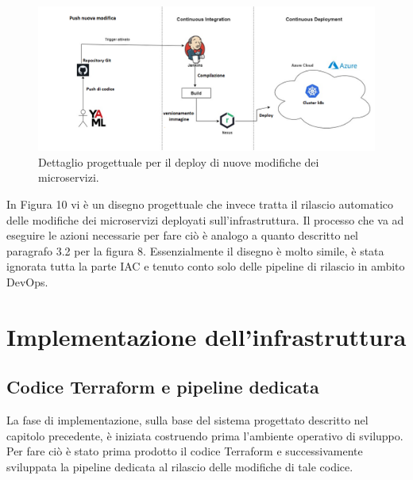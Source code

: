 \documentclass[a4paper,12pt]{report}
\begin{document}
\begin{figure}[h]
	\includegraphics[width=1.0\textwidth]{push_modifica}
    \caption{Dettaglio progettuale per il deploy di nuove modifiche dei microservizi.}
    \label{fig:push_modifica}
\end{figure}
\newline In Figura 10 vi è un disegno progettuale che invece tratta il rilascio automatico delle modifiche dei microservizi deployati sull'infrastruttura. Il processo che va ad eseguire le azioni necessarie per fare ciò è analogo a quanto descritto nel paragrafo 3.2 per la figura 8. Essenzialmente il disegno è molto simile, è stata ignorata tutta la parte IAC e tenuto conto solo delle pipeline di rilascio in ambito DevOps.\\
\chapter{Implementazione dell'infrastruttura}
\section{Codice Terraform e pipeline dedicata}
La fase di implementazione, sulla base del sistema progettato descritto nel capitolo precedente, è iniziata costruendo prima l'ambiente operativo di sviluppo. \\
Per fare ciò è stato prima prodotto il codice Terraform e successivamente sviluppata la pipeline dedicata al rilascio delle modifiche di tale codice.
\end{document}
